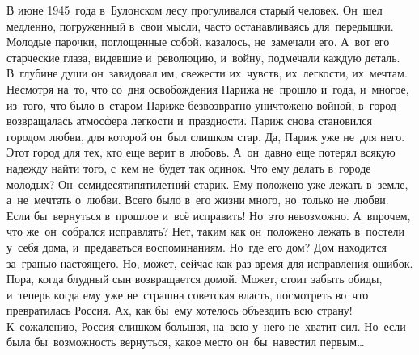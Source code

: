 \lettrine[lines=3, loversize=0.1]{В}{} июне 1945~года в~Булонском лесу прогуливался старый человек.
Он~шел медленно, погруженный в~свои мысли, часто останавливаясь для~передышки.
Молодые парочки, поглощенные собой, казалось, не~замечали его.
А~вот его старческие глаза, видевшие и~революцию, и~войну, подмечали каждую деталь.
В~глубине души он~завидовал им, свежести их~чувств, их~легкости, их~мечтам.
Несмотря на~то, что со~дня освобождения Парижа не~прошло и~года, и~многое, из~того, что было в~старом Париже безвозвратно уничтожено войной, в~город возвращалась атмосфера легкости и~праздности.
Париж снова становился городом любви, для которой он~был слишком стар.
Да, Париж уже не~для него.
Этот город для тех, кто еще верит в~любовь.
А~он~давно еще потерял всякую надежду найти того, с~кем не~будет так одинок.
Что ему делать в~городе молодых? Он~семидесятипятилетний старик.
Ему положено уже лежать в~земле, а~не~мечтать о~любви.
Всего было в~его жизни много, но~только не~любви.
Если бы~вернуться в~прошлое и~всё исправить! 
Но~это невозможно.
А~впрочем, что же~он~собрался исправлять? 
Нет, таким как он~положено лежать в~постели у~себя дома, и~предаваться воспоминаниям.
Но~где его дом? 
Дом находится за~гранью настоящего.
Но, может, сейчас как раз время для исправления ошибок.
Пора, когда блудный сын возвращается домой.
Может, стоит забыть обиды, и~теперь когда ему уже не~страшна советская власть, посмотреть во~что превратилась Россия.
Ах, как бы~ему хотелось объездить всю страну! 
К~сожалению, Россия слишком большая, на~всю у~него не~хватит сил.
Но~если была бы~возможность вернуться, какое место он~бы~навестил первым…

